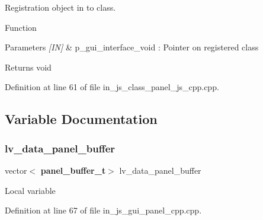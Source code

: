Registration object in to class. 

Function
\begin{DoxyParams}{Parameters}
{\em \mbox{[}\+I\+N\mbox{]}} & p\+\_\+gui\+\_\+interface\+\_\+void \+: Pointer on registered class \\
\hline
\end{DoxyParams}
\begin{DoxyReturn}{Returns}
void 
\end{DoxyReturn}


Definition at line 61 of file in\+\_\+js\+\_\+class\+\_\+panel\+\_\+js\+\_\+cpp.\+cpp.



\subsection{Variable Documentation}
\mbox{\label{group___panel_ga7ffe23ce476a3584619128bee46861c8}} 
\subsubsection{lv\_data\_panel\_buffer}
{\footnotesize\ttfamily vector$<$\textbf{ panel\+\_\+buffer\+\_\+t}$>$ lv\+\_\+data\+\_\+panel\+\_\+buffer}

Local variable 

Definition at line 67 of file in\+\_\+js\+\_\+gui\+\_\+panel\+\_\+cpp.\+cpp.

